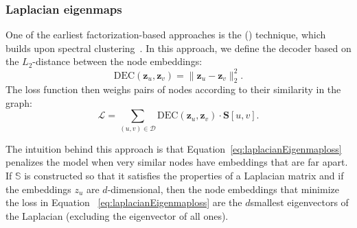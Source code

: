 \subsubsection{Laplacian eigenmaps}
One of the earliest factorization-based approaches is the  () technique, which builds upon spectral clustering~\cite{Belkin2001laplacianEigenmapsSpectralClusteringTechniquesEmbeddingClustering}. In this approach, we define the decoder based on the $L_2$-distance between the node embeddings:
\begin{equation*}
    \text{DEC}(\mathbf{z}_u, \mathbf{z}_v) = \|\mathbf{z}_u - \mathbf{z}_v\|_2^2.
\end{equation*}
The loss function then weighs pairs of nodes according to their similarity in the graph:
\begin{equation}\label{eq:laplacianEigenmaploss}
    \mathcal{L} = \sum_{(u,v)\in\mathcal{D}} \text{DEC}(\mathbf{z}_u, \mathbf{z}_v) \cdot \textbf{S}[u,v].
\end{equation}

The intuition behind this approach is that Equation~\eqref{eq:laplacianEigenmaploss} penalizes the model when very similar nodes have embeddings that are far apart. If $\mathbb{S}$ is constructed so that it satisfies the properties of a Laplacian matrix and if the embeddings $z_u$ are $d$-dimensional, then the node embeddings that minimize the loss in Equation ~\eqref{eq:laplacianEigenmaploss} are the $d $smallest eigenvectors of the Laplacian (excluding the eigenvector of all ones).

